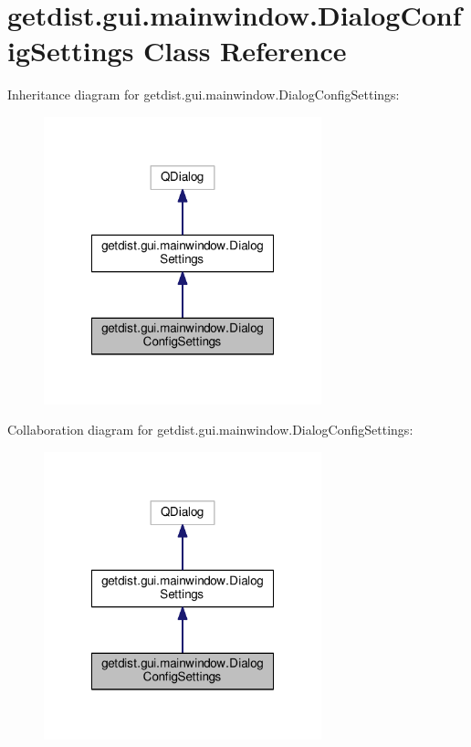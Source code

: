 \hypertarget{classgetdist_1_1gui_1_1mainwindow_1_1DialogConfigSettings}{}\section{getdist.\+gui.\+mainwindow.\+Dialog\+Config\+Settings Class Reference}
\label{classgetdist_1_1gui_1_1mainwindow_1_1DialogConfigSettings}


Inheritance diagram for getdist.\+gui.\+mainwindow.\+Dialog\+Config\+Settings\+:
\nopagebreak
\begin{figure}[H]
\begin{center}
\leavevmode
\includegraphics[width=228pt]{classgetdist_1_1gui_1_1mainwindow_1_1DialogConfigSettings__inherit__graph}
\end{center}
\end{figure}


Collaboration diagram for getdist.\+gui.\+mainwindow.\+Dialog\+Config\+Settings\+:
\nopagebreak
\begin{figure}[H]
\begin{center}
\leavevmode
\includegraphics[width=228pt]{classgetdist_1_1gui_1_1mainwindow_1_1DialogConfigSettings__coll__graph}
\end{center}
\end{figure}
